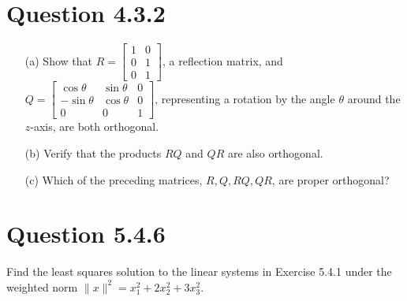 \documentclass[12pt]{article}
\begin{document}
\section*{Question 4.3.2}
\begin{itemize}
    \item[(a)] Show that \( R = \begin{bmatrix} 1 & 0 \\ 0 & 1 \\ 0 & 1 \end{bmatrix} \), a reflection matrix, and \( Q = \begin{bmatrix} \cos \theta & \sin \theta & 0 \\ -\sin \theta & \cos \theta & 0 \\ 0 & 0 & 1 \end{bmatrix} \), representing a rotation by the angle \( \theta \) around the \( z \)-axis, are both orthogonal.
    \item[(b)] Verify that the products \( RQ \) and \( QR \) are also orthogonal.
    \item[(c)] Which of the preceding matrices, \( R, Q, RQ, QR \), are proper orthogonal?
\end{itemize}

\section*{Question 5.4.6}
Find the least squares solution to the linear systems in Exercise 5.4.1 under the weighted norm \( \|x\|^2 = x_1^2 + 2x_2^2 + 3x_3^2 \).
\end{document}

